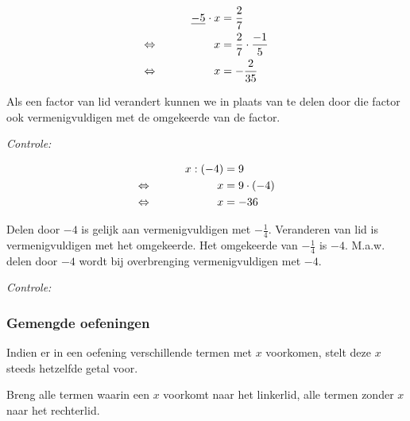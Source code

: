 \documentclass{bis}
\begin{document}
\begin{voorbeeld}
\begin{alignat*}{2}
     && \underline{-5}_{\tikzmark{a}}\cdot x &= \tikzmark{b}\dfrac{2}{7}\\
\LRA &&   x &= \dfrac{2}{7}\cdot\dfrac{-1}{5}\\
\LRA &&   x &= -\dfrac{2}{35}
\end{alignat*}


Als een factor van lid verandert kunnen we in plaats van te delen door die factor ook vermenigvuldigen met de omgekeerde van de factor.

{\em Controle: } 
\end{voorbeeld}

\begin{voorbeeld}

\begin{minipage}{0.5\textwidth}
\begin{alignat*}{2}
    && x : (-4) &= 9\\
\Leftrightarrow\mkern40mu&& x &= 9 \cdot(-4)\\
\Leftrightarrow\mkern40mu&&x &= -36
\end{alignat*}
\end{minipage}
\begin{minipage}[t]{0.5\textwidth}
Delen door $-4$ is gelijk aan vermenigvuldigen met $-\frac{1}{4}$. Veranderen van lid is vermenigvuldigen met het omgekeerde. Het omgekeerde van $-\frac{1}{4}$ is $-4$. M.a.w. delen door $-4$ wordt bij overbrenging vermenigvuldigen met $-4$.
\end{minipage}

{\em Controle: }\\
\end{voorbeeld}

\subsubsection{Gemengde oefeningen}

Indien er in een oefening verschillende termen met $x$ voorkomen, stelt deze $x$ steeds hetzelfde getal voor.

Breng alle termen waarin een $x$ voorkomt naar het linkerlid, alle termen zonder $x$ naar het rechterlid.
\end{document}
